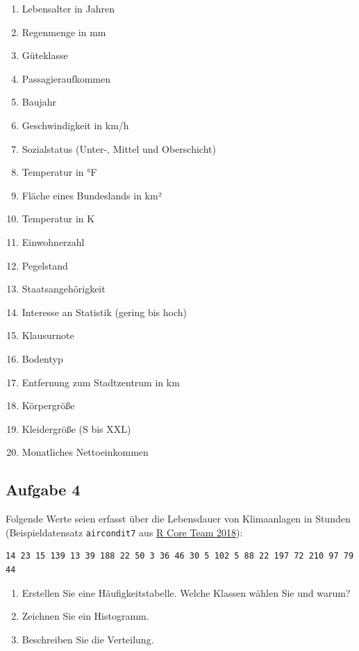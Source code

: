 \documentclass[
  11pt,
  ngerman,
  a4paper,
]{report}
\providecommand{\tightlist}{%
  \setlength{\itemsep}{0pt}\setlength{\parskip}{0pt}}
\begin{document}
\begin{enumerate}
\def\labelenumi{\alph{enumi})}
\tightlist
\item
  Lebensalter in Jahren
\item
  Regenmenge in mm
\item
  Güteklasse
\item
  Passagieraufkommen
\item
  Baujahr
\item
  Geschwindigkeit in km/h
\item
  Sozialstatus (Unter-, Mittel und Oberschicht)
\item
  Temperatur in °F
\item
  Fläche eines Bundeslands in km²
\item
  Temperatur in K
\item
  Einwohnerzahl
\item
  Pegelstand
\item
  Staatsangehörigkeit
\item
  Interesse an Statistik (gering bis hoch)
\item
  Klausurnote
\item
  Bodentyp
\item
  Entfernung zum Stadtzentrum in km
\item
  Körpergröße
\item
  Kleidergröße (S bis XXL)
\item
  Monatliches Nettoeinkommen
\end{enumerate}

\hypertarget{aufgabe-4}{%
\subsection{Aufgabe 4}\label{aufgabe-4}}

Folgende Werte seien erfasst über die Lebensdauer von Klimaanlagen in Stunden (Beispieldatensatz \texttt{aircondit7} aus \protect\hyperlink{ref-r}{R Core Team 2018}):

\begin{verbatim}
14 23 15 139 13 39 188 22 50 3 36 46 30 5 102 5 88 22 197 72 210 97 79 44
\end{verbatim}

\begin{enumerate}
\def\labelenumi{\alph{enumi})}
\tightlist
\item
  Erstellen Sie eine Häufigkeitstabelle. Welche Klassen wählen Sie und warum?
\item
  Zeichnen Sie ein Histogramm.
\item
  Beschreiben Sie die Verteilung.
\end{enumerate}
\end{document}
